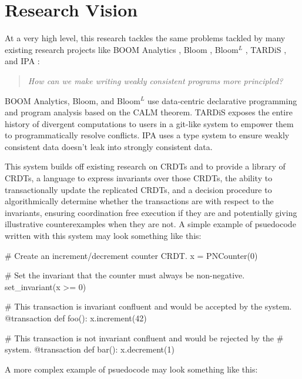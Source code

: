 \section{Research Vision}

At a very high level, this research tackles the same problems tackled by many
existing research projects like BOOM Analytics \cite{alvaro2010boom}, Bloom
\cite{alvaro2011consistency}, Bloom$^L$ \cite{conway2012logic}, TARDiS
\cite{crookstardis}, and IPA \cite{holt2016disciplined}:

\begin{quotation}
  \emph{How can we make writing weakly consistent programs more principled?}
\end{quotation}

BOOM Analytics, Bloom, and Bloom$^L$ use data-centric declarative programming
and program analysis based on the CALM theorem. TARDiS exposes the entire
history of divergent computations to users in a git-like system to empower them
to programmatically resolve conflicts. IPA uses a type system to ensure weakly
consistent data doesn't leak into strongly consistent data. 

This system builds off existing research on CRDTs and \iconfluence{} to provide
a library of CRDTs, a language to express invariants over those CRDTs, the
ability to transactionally update the replicated CRDTs, and a decision
procedure to algorithmically determine whether the transactions are
\iconfluent{} with respect to the invariants, ensuring coordination free
execution if they are and potentially giving illustrative counterexamples when
they are not. A simple example of psuedocode written with this system may look
something like this:

\begin{Python}
# Create an increment/decrement counter CRDT.
x = PNCounter(0)

# Set the invariant that the counter must always be non-negative.
set_invariant(x >= 0)

# This transaction is invariant confluent and would be accepted by the system.
@transaction
def foo():
  x.increment(42)

# This transaction is not invariant confluent and would be rejected by the
# system.
@transaction
def bar():
  x.decrement(1)
\end{Python}

A more complex example of psuedocode may look something like this:

